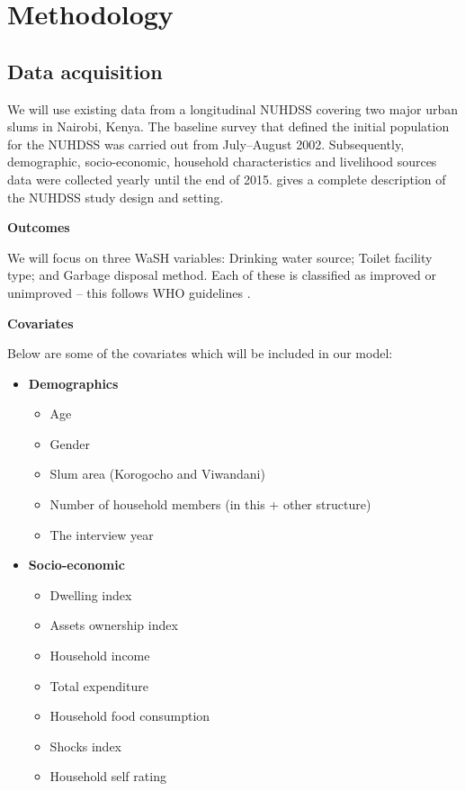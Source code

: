 \section*{Methodology}

\subsection*{Data acquisition}

We will use existing data from a longitudinal NUHDSS covering two major urban slums in Nairobi, Kenya. The baseline survey that defined the initial population for the NUHDSS was carried out from July–August 2002. Subsequently, demographic, socio-economic, household characteristics  and livelihood sources data were collected yearly until the end of 2015. \citet{beguy2015health} gives a complete description of the NUHDSS study design and setting.

\textbf{Outcomes}

We will focus on three WaSH variables: Drinking water source; Toilet facility type; and Garbage disposal method. Each of these is classified as improved or unimproved -- this follows WHO guidelines \citep{journal.pone.0151645}.

\textbf{Covariates}

Below are some of the covariates which will be included in our model:

\begin{itemize}
\item \textbf{Demographics}
\begin{itemize}
\item Age
\item Gender
\item Slum area (Korogocho and Viwandani)
\item  Number of household members (in this + other structure)
\item The interview year
\end{itemize}
\item \textbf{Socio-economic}
\begin{itemize}
\item Dwelling index
\item Assets ownership index
\item Household income
\item Total expenditure
\item Household food consumption
\item Shocks index
\item Household self rating
\end{itemize}
\end{itemize}

